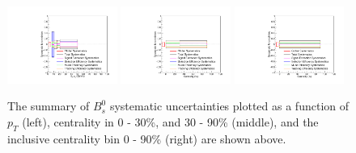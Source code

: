 \begin{figure}[hbtp]
\begin{center}
\includegraphics[width=0.32\textwidth]{Figures/Chapter5/BsPtSyst.pdf}
\includegraphics[width=0.32\textwidth]{Figures/Chapter5/BsCentSyst.pdf}
\includegraphics[width=0.32\textwidth]{Figures/Chapter5/BsIncSyst.pdf}
\caption{The summary of $B^0_s$ systematic uncertainties plotted as a function of $p_T$ (left), centrality in 0 - 30\%, and 30 - 90\% (middle), and the inclusive centrality bin 0 - 90\% (right) are shown above.}
\label{BsSystSumPlot}
\end{center}
\end{figure}

